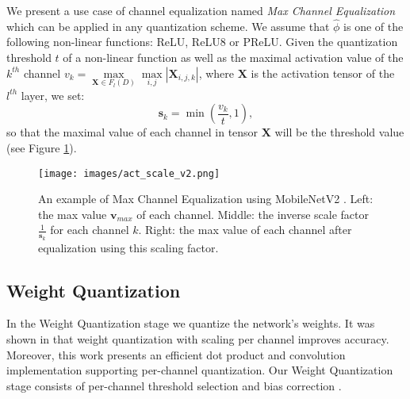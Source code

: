 \documentclass{article}
\newcommand{\vectorsym}[1]{\bm{#1}}
\newcommand{\brackets}[1]{\left(#1\right)}
\newcommand{\matsym}[1]{\mathbf{#1}}
\newcommand{\mbvtwo}{MobileNetV2 \cite{sandler2018mobilenetv2} }
\begin{document}
We present a use case of channel equalization named \textit{Max Channel Equalization} which can be applied in any quantization scheme.
We assume that $\hat{\phi}$ is one of the following non-linear functions: ReLU, ReLU8 or PReLU. Given the quantization threshold $t$ of a non-linear function as well as the maximal activation value of the $k^{th}$ channel  $v_k=\max\limits_{\matsym{X}\in F_l(D)}\max\limits_{i,j}|\matsym{X}_{i,j,k}|$, where $\matsym{X}$ is the activation tensor of the $l^{th}$ layer, we set:
\begin{equation}
    \vectorsym{s}_k=\min\brackets{\frac{v_k}{t},1},
\end{equation}
so that the maximal value of each channel in tensor $\matsym{X}$ will be the threshold value (see Figure \ref{fig:channels_corr}).




\begin{figure}[H]
    \centering
    \texttt{[image: images/act\_scale\_v2.png]}
    \caption{
    An example of Max Channel Equalization using \mbvtwo. 
    Left: the max value $\vectorsym{v}_{max}$ of each channel.
    Middle: the inverse scale factor $\frac{1}{\vectorsym{s}_k}$ for each channel $k$.
    Right: the max value of each channel after equalization using this scaling factor.
    }
    \label{fig:channels_corr}
\end{figure}



\subsection{Weight Quantization}
In the Weight Quantization stage we quantize the network's weights.
It was shown in \cite{krishnamoorthi2018quantizing,rastegari2016xnor} that weight quantization with scaling per channel improves accuracy.
Moreover, this work presents an efficient dot product and convolution implementation supporting per-channel quantization. 
Our Weight Quantization stage consists of per-channel threshold selection and bias correction \cite{nagel2019data}.
\end{document}
